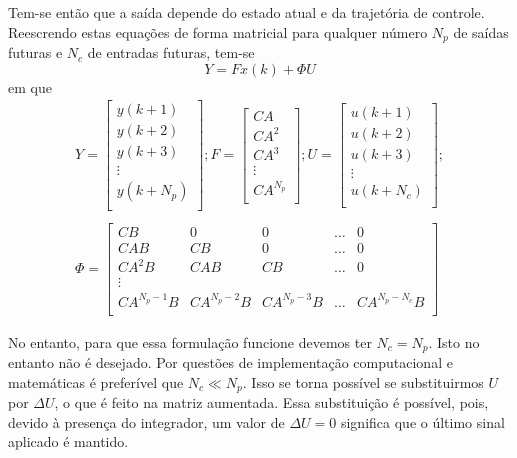 Tem-se então que a saída depende do estado atual e da trajetória de controle.
Reescrendo estas equações de forma matricial para qualquer número \( N_p \) de
saídas futuras e \( N_c\) de entradas futuras, tem-se
%
\begin{equation}
	\label{eq:Y}
	Y = F x(k) + \Phi U
\end{equation}
%
em que
%
\begin{equation}
	\begin{split}
		Y=
		\begin{bmatrix}
			y(k+1)   \\
			y(k+2)   \\
			y(k+3)   \\
			\vdots{} \\
			y(k+N_p) \\
		\end{bmatrix};
		F=
		\begin{bmatrix}
			CA       \\
			CA^2     \\
			CA^3     \\
			\vdots{} \\
			CA^{N_p} \\
		\end{bmatrix};
		U=
		\begin{bmatrix}
			u(k+1)   \\
			u(k+2)   \\
			u(k+3)   \\
			\vdots{} \\
			u(k+N_c) \\
		\end{bmatrix};
		\\
		\\
		\Phi=
		\begin{bmatrix}
			CB          & 0           & 0           & \hdots{} & 0             \\
			CAB         & CB          & 0           & \hdots{} & 0             \\
			CA^2B       & CAB         & CB          & \hdots{} & 0             \\
			\vdots{}    &             &             &          &               \\
			CA^{N_p-1}B & CA^{N_p-2}B & CA^{N_p-3}B & \hdots{} & CA^{N_p-N_c}B \\
		\end{bmatrix}
	\end{split}
\end{equation}

No entanto, para que essa formulação funcione devemos ter \( N_c = N_p \). Isto
no entanto não é desejado. Por questões de implementação computacional e
matemáticas é preferível que \( N_c \ll N_p \). Isso se torna possível se
substituirmos \( U \) por \( \Delta{}U \), o que é feito na matriz aumentada.
Essa substituição é possível, pois, devido à presença do integrador, um valor de
\( \Delta{}U = 0 \) significa que o último sinal aplicado é mantido.

